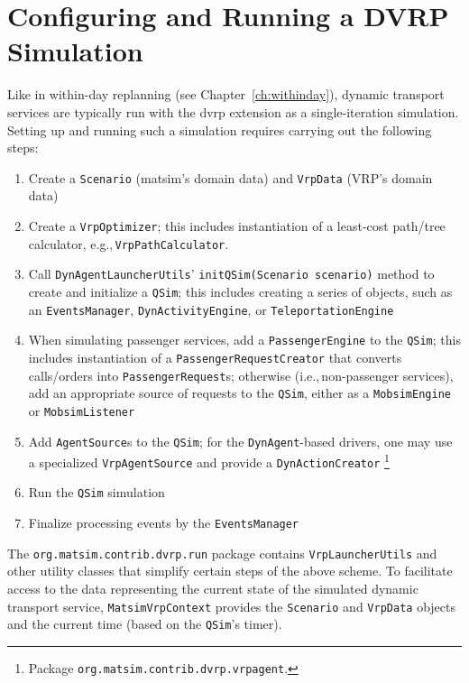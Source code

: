 \section{Configuring and Running a DVRP Simulation}
\label{sec:dvrp_config}
Like in within-day replanning (see Chapter~\ref{ch:withinday}), dynamic transport services are typically run with the \gls{dvrp} extension as a single-iteration simulation. Setting up and running such a simulation requires carrying out the following steps:
%
\begin{enumerate}
	\item Create a \lstinline$Scenario$ (\gls{matsim}'s domain data) and \lstinline$VrpData$ (VRP's domain data)	
	\item Create a \lstinline$VrpOptimizer$; this includes instantiation of a least-cost path/tree calculator, e.g.,\,\lstinline$VrpPathCalculator$.
	\item Call \lstinline$DynAgentLauncherUtils$' \lstinline$initQSim(Scenario scenario)$ method to create and initialize a \lstinline$QSim$; this includes creating a series of objects, such as an \lstinline$EventsManager$, \lstinline$DynActivityEngine$, or \lstinline$TeleportationEngine$
	
	\item When simulating passenger services, add a \lstinline$PassengerEngine$ to the \lstinline$QSim$; this includes instantiation of a \lstinline$PassengerRequestCreator$ that converts calls/orders into \lstinline$PassengerRequest$s; otherwise (i.e.,\,non-passenger services), add an appropriate source of requests to the \lstinline$QSim$, either as a \lstinline$MobsimEngine$ or \lstinline$MobsimListener$
	
	\item Add \lstinline$AgentSource$s to the \lstinline$QSim$; for the \lstinline$DynAgent$-based drivers, one may use a specialized \lstinline$VrpAgentSource$ and provide a \lstinline$DynActionCreator$%
	\footnote{
	Package \lstinline$org.matsim.contrib.dvrp.vrpagent$.
	}
	\item Run the \lstinline$QSim$ simulation
	\item Finalize processing events by the \lstinline$EventsManager$
\end{enumerate}

The \lstinline$org.matsim.contrib.dvrp.run$ package contains \lstinline$VrpLauncherUtils$ and other utility classes that simplify certain steps of the above scheme. To facilitate access to the data representing the current state of the simulated dynamic transport service, \lstinline$MatsimVrpContext$ provides the \lstinline$Scenario$ and \lstinline$VrpData$ objects and the current time (based on the \lstinline$QSim$'s timer).

